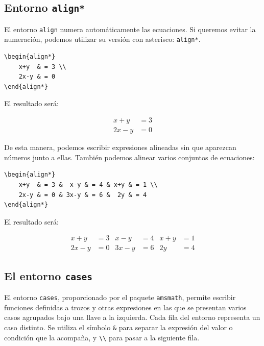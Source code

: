 \documentclass[11pt,a4paper]{article}
\theoremstyle{plain}
\theoremstyle{definition}
\theoremstyle{remark}
\theoremstyle{exercise}
\begin{document}
\subsection{Entorno \texttt{align*}}

El entorno \verb|align| numera automáticamente las ecuaciones. Si queremos evitar la numeración, podemos utilizar su versión con asterisco:
\verb|align*|.

\begin{lstlisting}
\begin{align*}
    x+y  & = 3 \\
    2x-y & = 0
\end{align*}
\end{lstlisting}

\noindent El resultado será:

\begin{paginarecuadrada}
\begin{align*}
    x+y  & = 3 \\
    2x-y & = 0
\end{align*}
\end{paginarecuadrada}

\medskip

\noindent De esta manera, podemos escribir expresiones alineadas sin que aparezcan números junto a ellas. También podemos alinear varios conjuntos de ecuaciones:

\begin{lstlisting}
\begin{align*}
    x+y  & = 3 &  x-y & = 4 & x+y & = 1 \\
    2x-y & = 0 & 3x-y & = 6 &  2y & = 4
\end{align*}
\end{lstlisting}

\noindent El resultado será:

\begin{paginarecuadrada}
\begin{align*}
    x+y  & = 3 &  x-y & = 4 & x+y & = 1 \\
    2x-y & = 0 & 3x-y & = 6 &  2y & = 4
\end{align*}
\end{paginarecuadrada}

 
\subsection{El entorno \texttt{cases}}

El entorno \texttt{cases}, proporcionado por el paquete \texttt{amsmath}, permite escribir funciones definidas a trozos y otras expresiones en las que se presentan varios casos agrupados bajo una llave a la izquierda. Cada fila del entorno representa un caso distinto. Se utiliza el símbolo \texttt{\&} para separar la expresión del valor o condición que la acompaña, y \texttt{\textbackslash\textbackslash} para pasar a la siguiente fila. 
\end{document}
